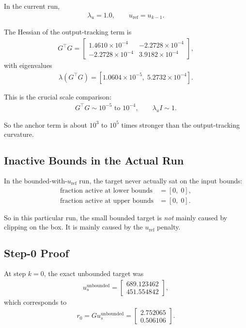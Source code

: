 \documentclass[11pt]{article}
\begin{document}
In the current run,
\begin{align}
\lambda_u = 1.0,
\qquad
u_{\mathrm{ref}} = u_{k-1}.
\end{align}

The Hessian of the output-tracking term is
\begin{align}
G^\top G =
\begin{bmatrix}
1.4610\times 10^{-4} & -2.2728\times 10^{-4} \\
-2.2728\times 10^{-4} & 3.9182\times 10^{-4}
\end{bmatrix},
\end{align}
with eigenvalues
\begin{align}
\lambda(G^\top G) = [1.0604\times 10^{-5},\; 5.2732\times 10^{-4}].
\end{align}

This is the crucial scale comparison:
\begin{align}
G^\top G \sim 10^{-5}\text{ to }10^{-4},
\qquad
\lambda_u I \sim 1.
\end{align}

So the anchor term is about \(10^3\) to \(10^5\) times stronger than the output-tracking curvature.

\subsection{Inactive Bounds in the Actual Run}

In the bounded-with-$u_{\mathrm{ref}}$ run, the target never actually sat on the input bounds:
\begin{align}
\text{fraction active at lower bounds} &= [0,\;0], \\
\text{fraction active at upper bounds} &= [0,\;0].
\end{align}

So in this particular run, the small bounded target is \emph{not} mainly caused by clipping on the box. It is mainly caused by the $u_{\mathrm{ref}}$ penalty.

\subsection{Step-0 Proof}

At step \(k=0\), the exact unbounded target was
\begin{align}
u_s^{\mathrm{unbounded}} =
\begin{bmatrix}
689.123462 \\
451.554842
\end{bmatrix},
\end{align}
which corresponds to
\begin{align}
r_0 = Gu_s^{\mathrm{unbounded}} =
\begin{bmatrix}
2.752065 \\
0.506106
\end{bmatrix}.
\end{align}
\end{document}
